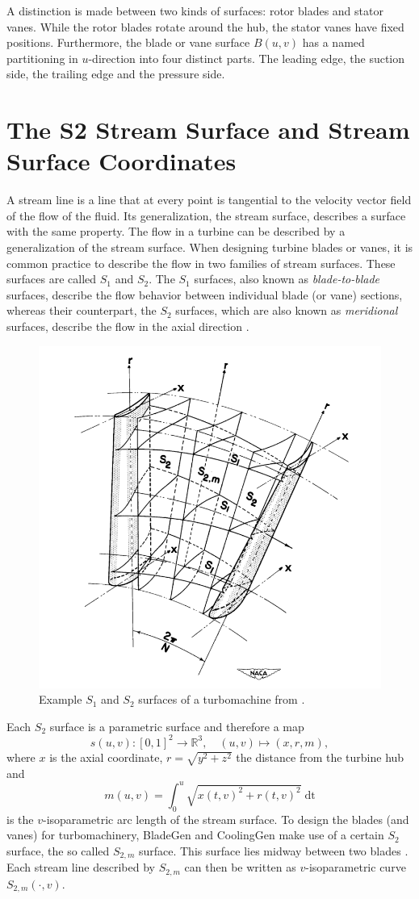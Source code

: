 \documentclass[a4paper, 11pt]{report}
\theoremstyle{definition}
\renewcommand{\emph}[1]{\textit{#1}}
\begin{document}
	A distinction is made between two kinds of surfaces: rotor blades and stator vanes. While the rotor blades rotate around the hub, the stator vanes have fixed positions. Furthermore, the blade or vane surface $B(u,v)$ has a named partitioning in $u$-direction into four distinct parts. The leading edge, the suction side, the trailing edge and the pressure side.

\section{The S2 Stream Surface and Stream Surface Coordinates}\label{sec:mrtheta}
	A stream line is a line that at every point is tangential to the velocity vector field of the flow of the fluid. Its generalization, the stream surface, describes a surface with the same property. The flow in a turbine can be described by a generalization of the stream surface. When designing turbine blades or vanes, it is common practice to describe the flow in two families of stream surfaces. These surfaces are called $S_1$ and $S_2$. The $S_1$ surfaces, also known as \emph{blade-to-blade} surfaces, describe the flow behavior between individual blade (or vane) sections, whereas their counterpart, the $S_2$ surfaces, which are also known as \emph{meridional} surfaces, describe the flow in the axial direction \cite{Wu1952}.

	\begin{figure}[H]
		\centering
		\includegraphics[width=.5\textwidth]{../assets/renamed_wu_naca_s2.png}
		\caption{Example $S_1$ and $S_2$ surfaces of a turbomachine from \cite{Wu1952}.}
	\end{figure}
	
	Each $S_2$ surface is a parametric surface and therefore a map
		$$s(u,v) : [0,1]^2 \rightarrow \mathbb{R}^3, \quad (u,v) \mapsto (x, r, m),$$
	where $x$ is the axial coordinate, $r = \sqrt{y^2+z^2}$ the distance from the turbine hub and 
		$$m(u,v) = \int_0^u \sqrt{x(t,v)^2 + r(t,v)^2} \; \textrm{dt}$$
	is the $v$-isoparametric arc length of the stream surface. To design the blades (and vanes) for turbomachinery, BladeGen and CoolingGen make use of a certain $S_2$ surface, the so called $S_{2,m}$ surface. This surface lies midway between two blades \cite{Wu1952}. Each stream line described by $S_{2,m}$ can then be written as $v$-isoparametric curve $S_{2,m}(\cdot, v)$.
\end{document}
